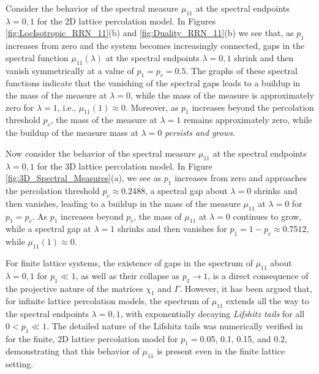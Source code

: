 \documentclass{cmslatex}
\begin{document}
Consider the behavior of the spectral measure $\mu_{11}$ at the spectral
endpoints $\lambda=0,1$ for the 2D lattice percolation model. In Figures
\ref{fig:LocIsotropic_RRN_11}(b) and \ref{fig:Duality_RRN_11}(b) we
see that, as $p_1$ increases from zero  
and the system becomes increasingly connected, gaps in the spectral
function $\mu_{11}(\lambda)$ at the spectral endpoints $\lambda=0,1$ shrink and then
vanish  symmetrically at a value of $p_1=p_c=0.5$. The graphs of 
these spectral functions indicate that the vanishing of the spectral
gaps leads to a buildup in the mass of the measure at $\lambda=0$, while the
mass of the measure is approximately zero for $\lambda=1$, i.e.,
$\mu_{11}(1)\approx0$. Moreover, as $p_1$ increases beyond the percolation
threshold $p_c$, the mass of the measure at $\lambda=1$ remains
approximately zero, while the buildup of the measure mass at
$\lambda=0$ \emph{persists and grows}. 



Now consider the behavior of the spectral measure $\mu_{11}$ at the spectral
endpoints $\lambda=0,1$ for the 3D lattice percolation model. In Figure
\ref{fig:3D_Spectral_Measures}(a), we see as $p_1$ increases from
zero and approaches the percolation threshold $p_c\approx0.2488$, a spectral
gap about $\lambda=0$ shrinks and then vanishes, leading to a
buildup in the mass of the measure $\mu_{11}$ at $\lambda=0$ for $p_1=p_c$. As
$p_1$ increases beyond $p_c$, the mass of $\mu_{11}$ at $\lambda=0$ continues
to grow, while a spectral gap at $\lambda=1$ shrinks and
then vanishes for $p_1=1-p_c\approx0.7512$, while $\mu_{11}(1)\approx0$.


For finite lattice systems, the existence of gaps in the spectrum of
$\mu_{11}$ about $\lambda=0,1$ for $p_1\ll1$, as well as their
collapse as $p_1\to1$, is a direct consequence \cite{Murphy:JMP:063506} of the
projective nature of the matrices $\chi_1$ and $\Gamma$. However, it has been argued
that, for infinite lattice percolation models, the spectrum of $\mu_{11}$
extends all the way to the spectral endpoints $\lambda=0,1$, with
exponentially decaying \emph{Lifshitz tails} for all $0<p_1\ll1$. The
detailed nature of the Lifshitz tails was numerically verified in
\cite{Jonckheere_Luck_JPA_1998} for the finite, 2D lattice percolation
model for $p_1=$0.05, 0.1, 0.15, and 0.2, demonstrating that this
behavior of $\mu_{11}$ is present even in the finite lattice setting.

 
\end{document}
